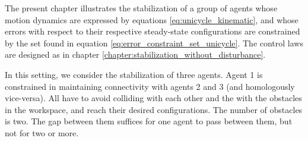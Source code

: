 The present chapter illustrates the stabilization of a group of agents whose
motion dynamics are expressed by equations \eqref{eq:unicycle_kinematic}, and
whose errors with respect to their respective steady-state configurations are
constrained by the set found in equation \eqref{eq:error_constraint_set_unicycle}.
The control laws are designed as in chapter
\ref{chapter:stabilization_without_disturbance}.

In this setting, we consider the stabilization of three agents. Agent 1
is constrained in maintaining connectivity with agents 2 and 3 (and
homologously vice-versa). All have to avoid colliding with each other
and the with the obstacles in the workspace, and reach their desired
configurations. The number of obstacles is two. The gap between them
suffices for one agent to pass between them, but not for two or more.
